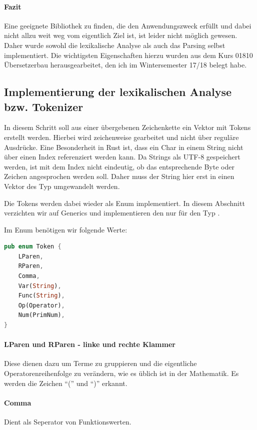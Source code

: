 \documentclass[11pt,a4paper, ngerman]{article}
\begin{document}
\paragraph{Fazit} Eine geeignete Bibliothek zu finden, die den Anwendungszweck erfüllt und dabei nicht allzu weit weg vom eigentlich Ziel ist, ist leider nicht möglich gewesen. Daher wurde sowohl die lexikalische Analyse als auch das Parsing selbst implementiert. Die wichtigsten Eigenschaften hierzu wurden aus dem Kurs 01810 Übersetzerbau herausgearbeitet, den ich im Wintersemester 17/18 belegt habe.

\subsection{Implementierung der lexikalischen Analyse bzw. Tokenizer} In diesem Schritt soll aus einer übergebenen Zeichenkette ein Vektor mit Tokens erstellt werden. Hierbei wird zeichenweise gearbeitet und nicht über reguläre Ausdrücke. Eine Besonderheit in Rust ist, dass ein Char in einem String nicht über einen Index referenziert werden kann. Da Strings als UTF-8 gespeichert werden, ist mit dem Index nicht eindeutig, ob das entsprechende Byte oder Zeichen angesprochen werden soll. Daher muss der String hier erst in einen Vektor des Typ  umgewandelt werden.

Die Tokens werden dabei wieder als Enum implementiert. In diesem Abschnitt verzichten wir auf Generics und implementieren den  nur für den Typ .

Im Enum benötigen wir folgende Werte:
\begin{lstlisting}[language=rust, caption={Enum Token}]
pub enum Token {
    LParen,
    RParen,
    Comma,
    Var(String),
    Func(String),
    Op(Operator),
    Num(PrimNum),
}
\end{lstlisting}

\paragraph{LParen und RParen - linke und rechte Klammer} Diese dienen dazu um Terme zu gruppieren und die eigentliche Operatorenreihenfolge zu verändern, wie es üblich ist in der Mathematik. Es werden die Zeichen ``('' und ``)'' erkannt.

\paragraph{Comma} Dient als Seperator von Funktionswerten.
\end{document}
